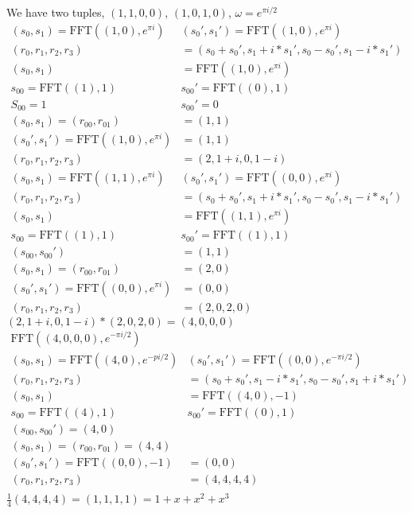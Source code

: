 \documentclass[11pt]{article}
\begin{document}
\begin{enumerate}
\begin{enumerate}
We have two tuples, $(1,1,0,0)$, $(1,0,1,0)$, $\omega=e^{\pi i/2}$
\begin{align*}
(s_0,s_1)=\text{FFT}((1,0), e^{\pi i})&(s_0',s_1')=\text{FFT}((1,0), e^{\pi i})\\
(r_0,r_1,r_2,r_3)&=(s_0+s_0',s_1+i*s_1',s_0-s_0',s_1-i*s_1')\\
(s_0,s_1)&=\text{FFT}((1,0), e^{\pi i})\\
s_{00} = \text{FFT}((1), 1)&s_{00}' = \text{FFT}((0), 1)\\
S_{00} = 1&s_{00}'=0\\
(s_0,s_1)=(r_{00},r_{01})&=(1,1)\\
(s_0',s_1')=\text{FFT}((1,0), e^{\pi i})&=(1,1)\\
(r_0,r_1,r_2,r_3)&=(2,1+i,0,1-i)
\end{align*}
\begin{align*}
(s_0,s_1)=\text{FFT}((1,1), e^{\pi i})&(s_0',s_1')=\text{FFT}((0,0), e^{\pi i})\\
(r_0,r_1,r_2,r_3)&=(s_0+s_0',s_1+i*s_1',s_0-s_0',s_1-i*s_1')\\
(s_0,s_1)&=\text{FFT}((1,1), e^{\pi i})\\
s_{00} = \text{FFT}((1), 1)&s_{00}'=\text{FFT}((1), 1)\\
(s_{00}, s_{00}')&=(1,1)\\
(s_0,s_1)=(r_{00},r_{01})&=(2,0)\\
(s_0',s_1')=\text{FFT}((0,0), e^{\pi i})&=(0,0)\\
(r_0,r_1,r_2,r_3)&=(2,0,2,0)
\end{align*}
$(2,1+i,0,1-i)*(2,0,2,0)=(4,0,0,0)$
\begin{align*}
\text{FFT}((4,0,0,0), e^{- \pi i/2})\\
(s_0,s_1)=\text{FFT}((4,0), e^{-pi / 2})&(s_0',s_1')=\text{FFT}((0,0), e^{-\pi i/2})\\
(r_0,r_1,r_2,r_3)&=(s_0+s_0',s_1-i*s_1',s_0-s_0',s_1+i*s_1')\\
(s_0, s_1)&=\text{FFT}((4,0), -1)\\
s_{00}=\text{FFT}((4), 1)&s_{00}'=\text{FFT}((0),1)\\
(s_{00},s_{00}')=(4,0)\\
(s_0,s_1)=(r_{00},r_{01})=(4,4)\\
(s_0',s_1')=\text{FFT}((0,0), -1)&=(0,0)\\
(r_0,r_1,r_2,r_3)&=(4,4,4,4)\\
\end{align*}
$\frac{1}{4}(4,4,4,4)=(1,1,1,1)=1+x+x^2+x^3$\\

\end{enumerate}
\end{enumerate}
\end{document}
